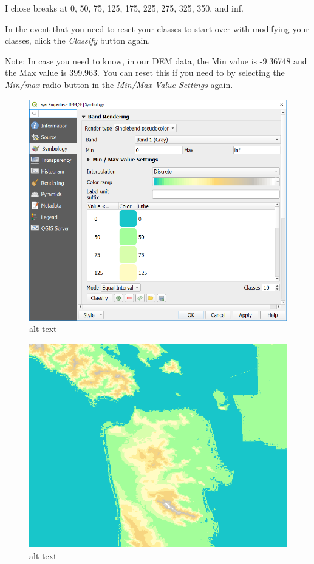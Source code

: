 \documentclass[
]{article}
\begin{document}
I chose breaks at 0, 50, 75, 125, 175, 225, 275, 325, 350, and inf.

In the event that you need to reset your classes to start over with modifying your classes, click the \emph{Classify} button again.

Note: In case you need to know, in our DEM data, the Min value is -9.36748 and the Max value is 399.963. You can reset this if you need to by selecting the \emph{Min/max} radio button in the \emph{Min/Max Value Settings} again.

\begin{figure}
\centering
\includegraphics{./images/Raster_LayerProperties.PNG}
\caption{alt text}
\end{figure}

\begin{figure}
\centering
\includegraphics{./images/Raster_DEM.PNG}
\caption{alt text}
\end{figure}
\end{document}
